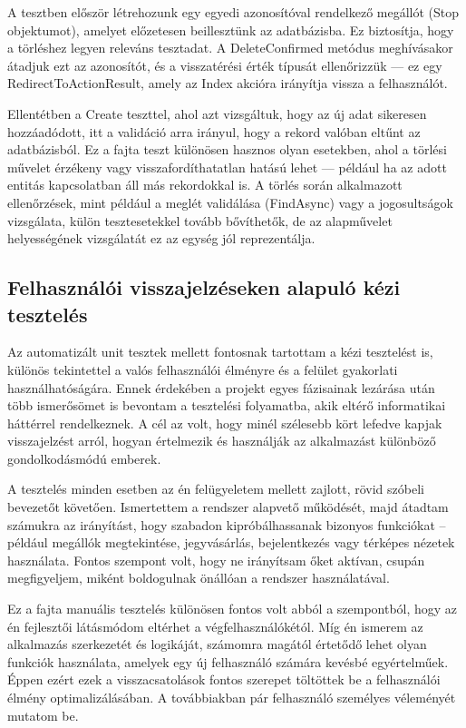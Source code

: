 A tesztben először létrehozunk egy egyedi azonosítóval rendelkező megállót (Stop objektumot), amelyet előzetesen beillesztünk az adatbázisba. Ez biztosítja, hogy a törléshez legyen releváns tesztadat. A DeleteConfirmed metódus meghívásakor átadjuk ezt az azonosítót, és a visszatérési érték típusát ellenőrizzük — ez egy RedirectToActionResult, amely az Index akcióra irányítja vissza a felhasználót.

Ellentétben a Create teszttel, ahol azt vizsgáltuk, hogy az új adat sikeresen hozzáadódott, itt a validáció arra irányul, hogy a rekord valóban eltűnt az adatbázisból. Ez a fajta teszt különösen hasznos olyan esetekben, ahol a törlési művelet érzékeny vagy visszafordíthatatlan hatású lehet — például ha az adott entitás kapcsolatban áll más rekordokkal is. A törlés során alkalmazott ellenőrzések, mint például a meglét validálása (FindAsync) vagy a jogosultságok vizsgálata, külön tesztesetekkel tovább bővíthetők, de az alapművelet helyességének vizsgálatát ez az egység jól reprezentálja.

\subsection{Felhasználói visszajelzéseken alapuló kézi tesztelés}

Az automatizált unit tesztek mellett fontosnak tartottam a kézi tesztelést is, különös tekintettel a valós felhasználói élményre és a felület gyakorlati használhatóságára. Ennek érdekében a projekt egyes fázisainak lezárása után több ismerősömet is bevontam a tesztelési folyamatba, akik eltérő informatikai háttérrel rendelkeznek. A cél az volt, hogy minél szélesebb kört lefedve kapjak visszajelzést arról, hogyan értelmezik és használják az alkalmazást különböző gondolkodásmódú emberek.

A tesztelés minden esetben az én felügyeletem mellett zajlott, rövid szóbeli bevezetőt követően. Ismertettem a rendszer alapvető működését, majd átadtam számukra az irányítást, hogy szabadon kipróbálhassanak bizonyos funkciókat – például megállók megtekintése, jegyvásárlás, bejelentkezés vagy térképes nézetek használata. Fontos szempont volt, hogy ne irányítsam őket aktívan, csupán megfigyeljem, miként boldogulnak önállóan a rendszer használatával.

Ez a fajta manuális tesztelés különösen fontos volt abból a szempontból, hogy az én fejlesztői látásmódom eltérhet a végfelhasználókétól. Míg én ismerem az alkalmazás szerkezetét és logikáját, számomra magától értetődő lehet olyan funkciók használata, amelyek egy új felhasználó számára kevésbé egyértelműek. Éppen ezért ezek a visszacsatolások fontos szerepet töltöttek be a felhasználói élmény optimalizálásában. A továbbiakban pár felhasználó személyes véleményét mutatom be.

